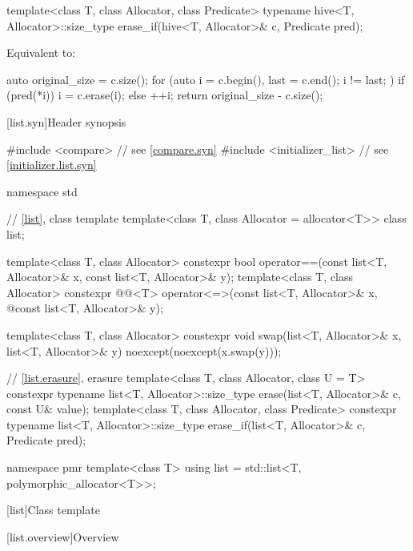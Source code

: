 %
\begin{itemdecl}
template<class T, class Allocator, class Predicate>
  typename hive<T, Allocator>::size_type
    erase_if(hive<T, Allocator>& c, Predicate pred);
\end{itemdecl}

\begin{itemdescr}
\pnum
\effects
Equivalent to:
\begin{codeblock}
auto original_size = c.size();
for (auto i = c.begin(), last = c.end(); i != last; ) {
  if (pred(*i)) {
    i = c.erase(i);
  } else {
    ++i;
  }
}
return original_size - c.size();
\end{codeblock}
\end{itemdescr}

[list.syn]{Header  synopsis}

%
\begin{codeblock}
#include <compare>              // see \ref{compare.syn}
#include <initializer_list>     // see \ref{initializer.list.syn}

namespace std {
  // \ref{list}, class template 
  template<class T, class Allocator = allocator<T>> class list;

  template<class T, class Allocator>
    constexpr bool operator==(const list<T, Allocator>& x, const list<T, Allocator>& y);
  template<class T, class Allocator>
    constexpr @@<T> operator<=>(const list<T, Allocator>& x,
    @\itcorr@                                      const list<T, Allocator>& y);

  template<class T, class Allocator>
    constexpr void swap(list<T, Allocator>& x, list<T, Allocator>& y)
      noexcept(noexcept(x.swap(y)));

  // \ref{list.erasure}, erasure
  template<class T, class Allocator, class U = T>
    constexpr typename list<T, Allocator>::size_type
      erase(list<T, Allocator>& c, const U& value);
  template<class T, class Allocator, class Predicate>
    constexpr typename list<T, Allocator>::size_type
      erase_if(list<T, Allocator>& c, Predicate pred);

  namespace pmr {
    template<class T>
      using list = std::list<T, polymorphic_allocator<T>>;
  }
}
\end{codeblock}

[list]{Class template }

[list.overview]{Overview}

